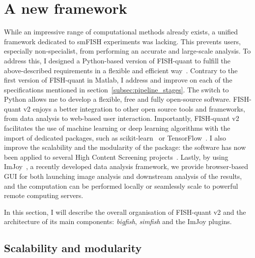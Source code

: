 \section{A new framework}
\label{sec:fqv2}

While an impressive range of computational methods already exists, a unified framework dedicated to \ac{smFISH} experiments was lacking.
This prevents users, especially non-specialist, from performing an accurate and large-scale analysis.
To address this, I designed a Python-based version of FISH-quant to fulfill the above-described requirements in a flexible and efficient way~\cite{Imbert_fq_2022}.
Contrary to the first version of FISH-quant in Matlab, I address and improve on each of the specifications mentioned in section~\ref{subsec:pipeline_stages}.
The switch to Python allows me to develop a flexible, free and fully open-source software.
FISH-quant v2 enjoys a better integration to other open source tools and frameworks, from data analysis to web-based user interaction.
Importantly, FISH-quant v2 facilitates the use of machine learning or deep learning algorithms with the import of dedicated packages, such as scikit-learn~\cite{pedregosa11a_scikitlearn} or TensorFlow~\cite{tensorflow_2015}.
I also improve the scalability and the modularity of the package: the software has now been applied to several High Content Screening projects~\cite{CHOUAIB_2020,safieddine_choreography_2021,pichon_kinesin_2021}.
Lastly, by using ImJoy~\cite{ouyang_imjoy_2019}, a recently developed data analysis framework, we provide browser-based \ac{GUI} for both launching image analysis and downstream analysis of the results, and the computation can be performed locally or seamlessly scale to powerful remote computing servers.

In this section, I will describe the overall organisation of FISH-quant v2 and the architecture of its main components: \emph{bigfish}, \emph{simfish} and the ImJoy plugins.

\subsection{Scalability and modularity}
\label{subsec:framework}

